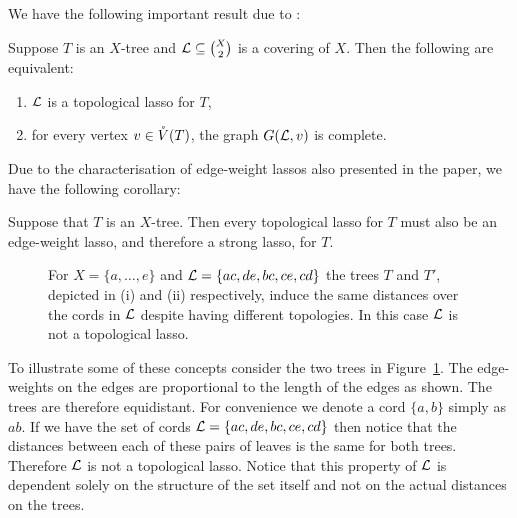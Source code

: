 We have the following important result due to \cite{HP13}:
\begin{lem}
  \label{lem:child-edge-graph-complete}
  Suppose $T$ is an $X$-tree and ${\mathcal L} \subseteq {X \choose 2}$ is a covering
  of $X$.  Then the following are equivalent:
  \begin{enumerate}
  \item ${\mathcal L}$ is a topological lasso for $T$,
  \item for every vertex $v \in \mathring{V}(T)$, the graph $G({\mathcal L},v)$ is complete.
  \end{enumerate}
\end{lem}

Due to the characterisation of edge-weight lassos also presented in the paper,
we have the following corollary:
\begin{cor}
  \label{cor:topo-is-edge-weight}
  Suppose that $T$ is an $X$-tree.  Then every topological lasso for $T$ must
  also be an edge-weight lasso, and therefore a strong lasso, for $T$.
\end{cor}

\begin{figure}
\begin{center}

\end{center}
\caption{For $X = \{a,\dotsc,e\}$ and ${\mathcal L}=\{ac,de,bc,ce,cd\}$ the trees $T$
  and $T'$, depicted in (i) and (ii) respectively, induce the same distances
  over the cords in ${\mathcal L}$ despite having different topologies.  In this case
  ${\mathcal L}$ is not a topological lasso.}
\label{fig:lasso-example}
\end{figure}

To illustrate some of these concepts consider the two trees in
Figure~\ref{fig:lasso-example}.  The edge-weights on the edges are
proportional to the length of the edges as shown.  The trees are therefore
equidistant.  For convenience we denote a cord $\{a,b\}$ simply as $ab$.  If
we have the set of cords ${\mathcal L}=\{ac,de,bc,ce,cd\}$ then notice that the
distances between each of these pairs of leaves is the same for both trees.
Therefore ${\mathcal L}$ is not a topological lasso.  Notice that this property of
${\mathcal L}$ is dependent solely on the structure of the set itself and not on the
actual distances on the trees.

